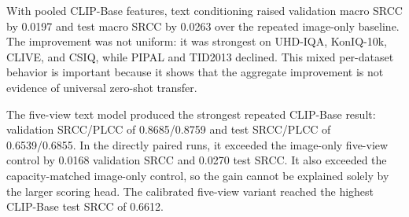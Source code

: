 \documentclass{article}
\begin{document}
\begin{table}[htbp]
\centering
\small
\setlength{\tabcolsep}{3pt}
\caption{Backbone, multi-view, and efficiency comparison. Validation values are three-dataset macro correlations and test values are nine-dataset macro correlations.}
\label{tab:text-main-results}
\end{table}

With pooled CLIP-Base features, text conditioning raised validation macro SRCC by 0.0197 and test macro SRCC by 0.0263 over the repeated image-only baseline. The improvement was not uniform: it was strongest on UHD-IQA, KonIQ-10k, CLIVE, and CSIQ, while PIPAL and TID2013 declined. This mixed per-dataset behavior is important because it shows that the aggregate improvement is not evidence of universal zero-shot transfer.

The five-view text model produced the strongest repeated CLIP-Base result: validation SRCC/PLCC of 0.8685/0.8759 and test SRCC/PLCC of 0.6539/0.6855. In the directly paired runs, it exceeded the image-only five-view control by 0.0168 validation SRCC and 0.0270 test SRCC. It also exceeded the capacity-matched image-only control, so the gain cannot be explained solely by the larger scoring head. The calibrated five-view variant reached the highest CLIP-Base test SRCC of 0.6612.
\end{document}
